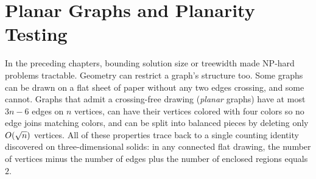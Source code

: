 \chapter{Planar Graphs and Planarity Testing}

In the preceding chapters, bounding solution size or treewidth made NP-hard problems
tractable. Geometry can restrict a graph's structure too. Some graphs can be drawn on a flat
sheet of paper without any two edges crossing, and some cannot. Graphs that admit a
crossing-free drawing (\emph{planar} graphs) have at most $3n - 6$ edges on $n$ vertices,
can have their vertices colored with four colors so no edge joins matching colors, and can
be split into balanced pieces by deleting only $O(\sqrt{n})$ vertices. All of these
properties trace back to a single counting identity discovered on three-dimensional solids:
in any connected flat drawing, the number of vertices minus the number of edges plus the
number of enclosed regions equals $2$.

